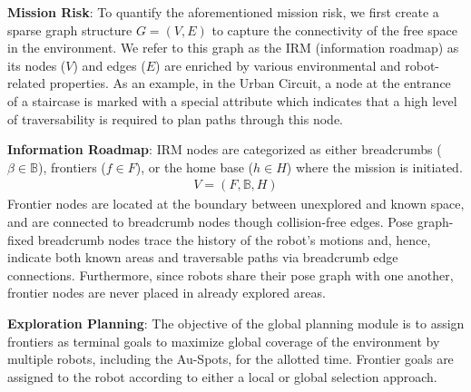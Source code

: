 \documentclass[letterpaper, 10pt, conference]{ieeeconf}      %
\newcommand{\ph}[1]{{\textbf{#1}:}} %
\newcommand{\todo}[1]{{\color{red} #1 }} %
\begin{document}
\ph{Mission Risk}
To quantify the aforementioned mission risk, we first create a sparse graph structure $G = (V, E)$ to capture the connectivity of the free space in the environment. 
We refer to this graph as the IRM (information roadmap) as its nodes ($V$) and edges ($E$) are enriched by various environmental and robot-related properties. As an example, in the Urban Circuit, a node at the entrance of a staircase is marked with a special attribute which indicates that a high level of traversability%
is required to plan paths through this node. 

\ph{Information Roadmap}
IRM nodes are categorized as either breadcrumbs ($\beta\in\mathbb{B}$), frontiers ($f\in F$), or the home base ($h\in H$) where the mission is initiated. 
\begin{align}
    V = (F, \mathbb{B}, H)
\end{align}
Frontier nodes are located at the boundary between unexplored and known space, and are connected to breadcrumb nodes though collision-free edges. %
Pose graph-fixed breadcrumb nodes trace the history of the robot's motions and, hence, indicate both known areas and traversable paths via breadcrumb edge connections. %
Furthermore, since robots share their pose graph with one another, frontier nodes are never placed in already explored areas.  


\ph{Exploration Planning} 
The objective of the global planning module is to assign frontiers as terminal goals to maximize global coverage of the environment by multiple robots, including the Au-Spots, for the allotted time. Frontier goals are assigned to the robot according to either a local or global selection approach. 
\end{document}
